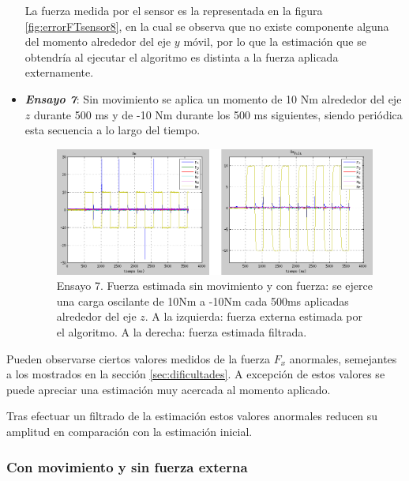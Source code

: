 \begin{itemize}
La fuerza medida por el sensor es la representada en la figura \ref{fig:errorFTsensor8}, en la cual se observa que no existe componente alguna del momento alrededor del eje $y$ móvil, por lo que la estimación que se obtendría al ejecutar el algoritmo es distinta a la fuerza aplicada externamente. \par 

\item \textbf{\emph{Ensayo 7}}: Sin movimiento se aplica un momento de 10 Nm alrededor del eje $z$ durante 500 ms y de -10 Nm durante los 500 ms siguientes, siendo periódica esta secuencia a lo largo del tiempo. \par 

\begin{figure}[h!]
\centering
\includegraphics[scale=0.4]{Figuras/smcf-Nz}
\caption[Ensayo 7. Fuerza estimada sin movimiento y con fuerza]{Ensayo 7. Fuerza estimada sin movimiento y con fuerza: se ejerce una carga oscilante de 10Nm a -10Nm cada 500ms aplicadas alrededor del eje $z$. A la izquierda: fuerza externa estimada por el algoritmo. A la derecha: fuerza estimada filtrada.}
\label{fig:smcf-Nz}
\end{figure}
\end{itemize}

Pueden observarse ciertos valores medidos de la fuerza $F_x$ anormales, semejantes a los mostrados en la sección \ref{sec:dificultades}. A excepción de estos valores se puede apreciar una estimación muy acercada al momento aplicado. \par 

Tras efectuar un filtrado de la estimación estos valores anormales reducen su amplitud en comparación con la estimación inicial. \par 

\subsubsection{Con movimiento y sin fuerza externa}

